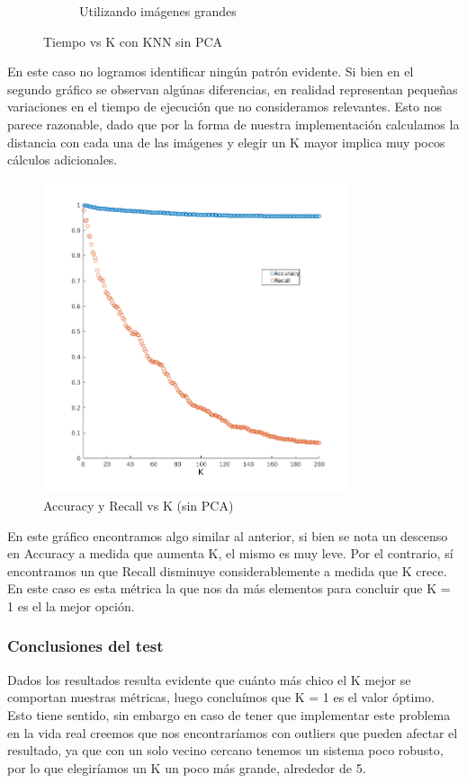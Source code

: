 \begin{figure}[H]
\begin{subfigure}[h]{0.62\linewidth}
\caption{Utilizando imágenes grandes}
\end{subfigure}%
\caption{Tiempo vs K con KNN sin PCA}
\end{figure}


En este caso no logramos identificar ningún patrón evidente. Si bien en el segundo gráfico se observan algúnas diferencias, en realidad representan pequeñas variaciones en el tiempo de ejecución que no consideramos relevantes.
Esto nos parece razonable, dado que por la forma de nuestra implementación calculamos la distancia con cada una de las imágenes y elegir un K mayor implica muy pocos cálculos adicionales.

\begin{figure}[H]
	\centering
	\includegraphics[width=0.8\textwidth]{img/Acc_recall_k_knn.png}
	\caption{Accuracy y Recall vs K (sin PCA)}
	\label{fig: Accuracy y Recall vs K (sin PCA)}
\end{figure}

En este gráfico encontramos algo similar al anterior, si bien se nota un descenso en Accuracy a medida que aumenta K, el mismo es muy leve.
Por el contrario, sí encontramos un que Recall disminuye considerablemente a medida que K crece. En este caso es esta métrica la que nos da más elementos para concluir que K = 1 es el la mejor opción.



\subsubsection*{Conclusiones del test}
Dados los resultados resulta evidente que cuánto más chico el K mejor se comportan nuestras métricas, luego concluímos que K = 1 es el valor óptimo.
Esto tiene sentido, sin embargo en caso de tener que implementar este problema en la vida real creemos que nos encontraríamos con outliers que pueden afectar el resultado, ya que con un solo vecino cercano tenemos un sistema poco robusto, por lo que elegiríamos un K un poco más grande, alrededor de 5.

